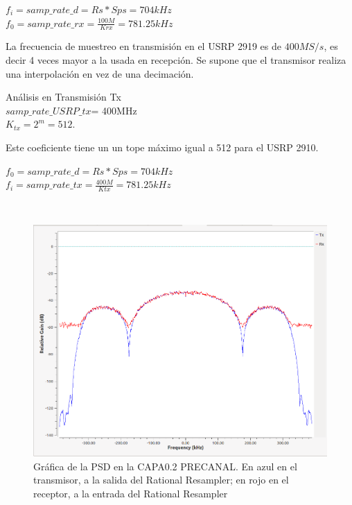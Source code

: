 \begin{itemize}
\begin{center}
$f_i=samp\_rate\_d= Rs*Sps=704kHz$\\

$f_{0}=samp\_rate\_rx=\frac{100M}{Krx}=781.25kHz$\\

\end{center}
La frecuencia de muestreo en transmisión en el USRP 2919 es de $400 MS/s$, es decir 4 veces mayor a la usada en recepción.
Se supone que el transmisor realiza una interpolación en vez de una decimación.
\begin{center}
Análisis en Transmisión Tx\\
$samp\_rate\_USRP\_tx$= 400MHz\\
$K_{tx}= 2^{m}=512 $.\\ 
\end{center}
Este coeficiente tiene un un tope máximo igual a 512 para el USRP 2910.\\

\begin{center}

$f_0=samp\_rate\_d= Rs*Sps=704kHz$\\
$f_i=samp\_rate\_tx=\frac{400M}{Ktx}=781.25kHz$\\
\end{center}
\ \\ %




\begin{figure}[h!]
	\captionsetup{justification = raggedright, singlelinecheck = false}
	\caption{Gráfica de la PSD en la CAPA0.2 PRECANAL. En azul en el transmisor, a la salida del Rational Resampler; en rojo en el receptor, a la entrada del Rational Resampler}
	\label{fig:ej1_precanal_psd_capa02}
    \includegraphics[width=0.8\linewidth]{Imagenes/capa03.png}
    \centering
\end{figure}


\end{itemize}
